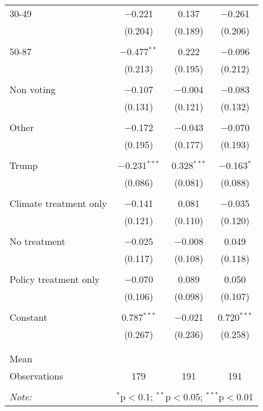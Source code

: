 \begin{tabular}{@{\extracolsep{5pt}}lccc}
 30-49 & $-$0.221 & 0.137 & $-$0.261 \\ 
  & (0.204) & (0.189) & (0.206) \\ 
  & & & \\ 
 50-87 & $-$0.477$^{**}$ & 0.222 & $-$0.096 \\ 
  & (0.213) & (0.195) & (0.212) \\ 
  & & & \\ 
 Non voting & $-$0.107 & $-$0.004 & $-$0.083 \\ 
  & (0.131) & (0.121) & (0.132) \\ 
  & & & \\ 
 Other & $-$0.172 & $-$0.043 & $-$0.070 \\ 
  & (0.195) & (0.177) & (0.193) \\ 
  & & & \\ 
 Trump & $-$0.231$^{***}$ & 0.328$^{***}$ & $-$0.163$^{*}$ \\ 
  & (0.086) & (0.081) & (0.088) \\ 
  & & & \\ 
 Climate treatment only & $-$0.141 & 0.081 & $-$0.035 \\ 
  & (0.121) & (0.110) & (0.120) \\ 
  & & & \\ 
 No treatment & $-$0.025 & $-$0.008 & 0.049 \\ 
  & (0.117) & (0.108) & (0.118) \\ 
  & & & \\ 
 Policy treatment only & $-$0.070 & 0.089 & 0.050 \\ 
  & (0.106) & (0.098) & (0.107) \\ 
  & & & \\ 
 Constant & 0.787$^{***}$ & $-$0.021 & 0.720$^{***}$ \\ 
  & (0.267) & (0.236) & (0.258) \\ 
  & & & \\ 
\hline \\[-1.8ex] 
Mean &  &  &  \\ 
Observations & 179 & 191 & 191 \\ 
\hline 
\hline \\[-1.8ex] 
\textit{Note:}  & \multicolumn{3}{r}{$^{*}$p$<$0.1; $^{**}$p$<$0.05; $^{***}$p$<$0.01} \\ 
\end{tabular} 

